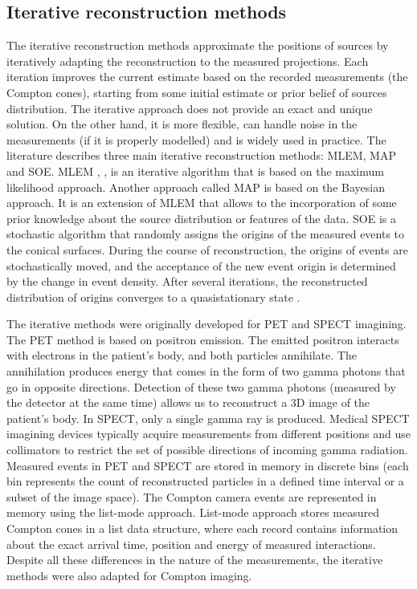 \subsection{Iterative reconstruction methods}
The iterative reconstruction methods approximate the positions of sources by iteratively adapting the reconstruction to the measured projections.
Each iteration improves the current estimate based on the recorded measurements (the Compton cones), starting from some initial estimate or prior belief of sources distribution. 
The iterative approach does not provide an exact and unique solution. On the other hand, it is more flexible, can handle noise in the measurements (if it is properly modelled) and is widely used in practice.
The literature describes three main iterative reconstruction methods: \acf{MLEM}, \acf{MAP} and \acf{SOE}.
\ac{MLEM} \cite{MLEM_Shepp_1982}, \cite{MLEM_Lange_Carlson_1984}, \cite{MLEM_Wilderman_2000} is an iterative algorithm that is based on the maximum likelihood approach.
Another approach called \ac{MAP} \cite{MLEM_Lange_Carlson_1984} is based on the Bayesian approach.
It is an extension of \ac{MLEM} that allows to the incorporation of some prior knowledge about the source distribution or features of the data.
\ac{SOE} is a stochastic algorithm that randomly assigns the origins of the measured events to the conical surfaces.
During the course of reconstruction, the origins of events are stochastically moved, and the acceptance of the new event origin is determined by the change in event density.
After several iterations, the reconstructed distribution of origins converges to a quasistationary state \cite{SOE_Andreyev_2009}.

The iterative methods were originally developed for \ac{PET} and \ac{SPECT} imagining.
The \ac{PET}  method is based on positron emission. 
The emitted positron interacts with electrons in the patient's body, and both particles annihilate. 
The annihilation produces energy that comes in the form of two gamma photons that go in opposite directions.
Detection of these two gamma photons (measured by the detector at the same time) allows us to reconstruct a 3D image of the patient's body.
In \ac{SPECT}, only a single gamma ray is produced. 
Medical \ac{SPECT} imagining devices typically acquire measurements from different positions and use collimators to restrict the set of possible directions of incoming gamma radiation.
Measured events in \ac{PET} and \ac{SPECT} are stored in memory in discrete bins (each bin represents the count of reconstructed particles in a defined time interval or a subset of the image space).
The Compton camera events are represented in memory using the list-mode approach.
List-mode approach stores measured Compton cones in a list data structure, where each record contains information about the exact arrival time, position and energy of measured interactions.
Despite all these differences in the nature of the measurements, the iterative methods were also adapted for Compton imaging.

